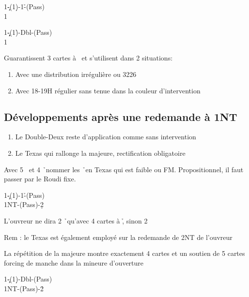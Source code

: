 \documentclass[a4paper]{article}
\begin{document}
\begin{bidtable}
1\c-(1\d)-1\h-(Pass)\\
1\s
\end{bidtable}

\begin{bidtable}
1\c\d-(1\h)-Dbl-(Pass)\\
1\s
\end{bidtable}

Guarantissent 3 cartes à \s\ et s’utilisent dans 2 situations:

\begin{enumerate}
\item Avec une distribution irrégulière ou 3226

\item Avec 18-19H régulier sans tenue dans la couleur d’intervention

\end{enumerate}

\subsection{Développements après une redemande à 1NT}

\begin{enumerate}
\item Le Double-Deux reste d’application comme sans intervention

\item Le Texas qui rallonge la majeure, rectification obligatoire

\end{enumerate}

Avec 5 \s\ et 4 \h\ nommer les \h\ en Texas qui est faible ou FM. 
Propositionnel, il faut passer par le Roudi fixe.

\begin{bidtable}
1\c-(1\d)-1\h-(Pass)\\
1NT-(Pass)-2\d
\end{bidtable}

L’ouvreur ne dira 2 \h\ qu’avec 4 cartes à \h , sinon 2 \s 

Rem : le Texas est également employé sur la redemande de 2NT de l’ouvreur

La répétition de la majeure montre exactement 4 cartes et un soutien 
de 5 cartes forcing de manche dans la mineure d’ouverture

\begin{bidtable}
1\c-(1\d)-Dbl-(Pass)\\
1NT-(Pass)-2\h
\end{bidtable}
\end{document}
